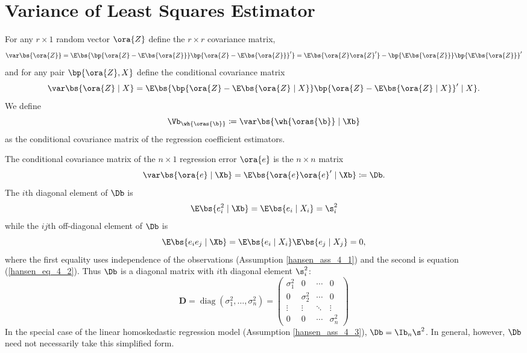 \section{Variance of Least Squares Estimator}

For any $r \times 1$ random vector $\ora{Z}$ define the $r \times r$ covariance matrix,
\begin{equation}
    \notag
    \var\bs{\ora{Z}} = \E\bs{\bp{\ora{Z} - \E\bs{\ora{Z}}} \bp{\ora{Z} - \E\bs{\ora{Z}}}^\prime} = \E\bs{\ora{Z} \ora{Z}^\prime} - \bp{\E\bs{\ora{Z}}} \bp{\E\bs{\ora{Z}}}^\prime
\end{equation}
and for any pair $\bp{\ora{Z}, X}$ define the conditional covariance matrix
\begin{equation}
    \notag
    \var\bs{\ora{Z} \mid X} = \E\bs{\bp{\ora{Z} - \E\bs{\ora{Z} \mid X}} \bp{\ora{Z} - \E\bs{\ora{Z} \mid X}}^\prime \mid X}.
\end{equation}
We define 
$$\Vb_{\wh{\oras{\b}}} \coloneqq \var\bs{\wh{\oras{\b}} \mid \Xb}$$
as the conditional covariance matrix of the regression coefficient estimators.

The conditional covariance matrix of the $n \times 1$ regression error $\ora{e}$ is the $n \times n$ matrix
\begin{equation}
    \notag
    \var\bs{\ora{e} \mid \Xb} = \E\bs{\ora{e}\ora{e}^\prime \mid \Xb} \coloneqq \Db.
\end{equation}
The $i$th diagonal element of $\Db$ is 
\begin{equation}
    \notag
    \E\bs{e_i^2 \mid \Xb} = \E\bs{e_i \mid X_i} = \s_i^2
\end{equation}
while the $ij$th off-diagonal element of $\Db$ is 
\begin{equation}
    \notag
    \E\bs{e_ie_j \mid \Xb} = \E\bs{e_i \mid X_i} \E\bs{e_j \mid X_j} = 0,
\end{equation}
where the first equality uses independence of the observations (Assumption \ref{hansen_ass_4_1}) and the second is equation (\ref{hansen_eq_4_2}). Thus $\Db$ is a diagonal matrix with $i$th diagonal element $\s_i^2$:
\begin{equation}
    \label{hansen_eq_4_8}
    \boldsymbol{D}=\operatorname{diag}\left(\sigma_1^2, \ldots, \sigma_n^2\right)=\left(\begin{array}{cccc}
        \sigma_1^2 & 0 & \cdots & 0 \\
        0 & \sigma_2^2 & \cdots & 0 \\
        \vdots & \vdots & \ddots & \vdots \\
        0 & 0 & \cdots & \sigma_n^2
    \end{array}\right)
\end{equation}
In the special case of the linear homoskedastic regression model (Assumption \ref{hansen_ass_4_3}), $\Db = \Ib_n \s^2$. In general, however, $\Db$ need not necessarily take this simplified form.

